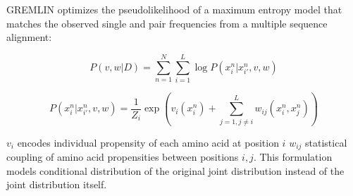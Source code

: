 \documentclass[landscape]{sciposter}
\begin{document}
\begin{multicols}{3}
GREMLIN optimizes the pseudolikelihood  of a maximum entropy model that matches the observed single and pair frequencies from a multiple sequence alignment:

$$ P(v,w | D) = \sum_{n=1}^N \sum_{i=1}^L \log P (x_i^n | x_{i'}^n, v, w)$$

$$ P (x_i^n | x_{i'}^n, v, w) = \frac{1}{Z_i} \exp \left ( v_i(x_i^n) + \sum_{j=1,j \neq i}^L w_{ij}(x_i^n,x_j^n) \right )$$

$v_i$ encodes individual propensity of each amino acid at position $i$ $w_{ij}$ statistical coupling of amino acid propensities between positions $i,j$. 
This formulation models conditional distribution of the original joint distribution instead of the joint distribution itself. 

\end{multicols}
\end{document}
